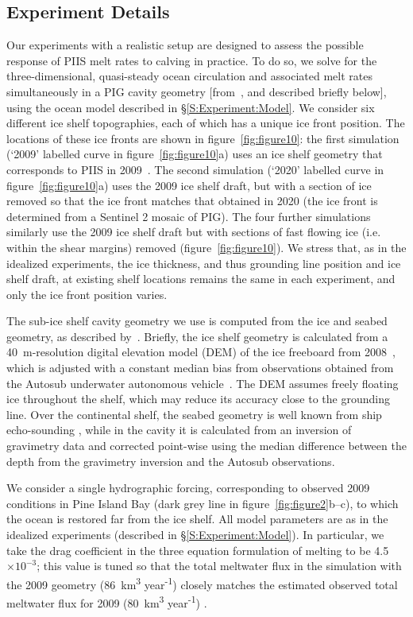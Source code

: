 \documentclass[draft]{agujournal2019}
\begin{document}
\subsection{Experiment Details}
Our experiments with a realistic setup are designed to assess the possible response of PIIS melt rates to calving in practice. To do so, we solve for the three-dimensional, quasi-steady ocean circulation and associated melt rates simultaneously in a PIG cavity geometry [from~, and described briefly below], using the ocean model described in \S\ref{S:Experiment:Model}. We consider six different ice shelf topographies, each of which has a unique ice front position. The locations of these ice fronts are shown in figure~\ref{fig:figure10}: the first simulation (`2009' labelled curve in figure~\ref{fig:figure10}a) uses an ice shelf geometry that corresponds to PIIS in 2009~\cite{Dutrieux2014Science}. The second simulation (`2020' labelled curve in figure~\ref{fig:figure10}a) uses the 2009 ice shelf draft, but with a section of ice removed so that the ice front matches that obtained in 2020 (the ice front is determined from a Sentinel 2 mosaic of PIG). The four further simulations similarly use the 2009 ice shelf draft but with sections of fast flowing ice (i.e. within the shear margins) removed (figure~\ref{fig:figure10}). We stress that, as in the idealized experiments, the ice thickness, and thus grounding line position and ice shelf draft, at existing shelf locations remains the same in each experiment, and only the ice front position varies.

The sub-ice shelf cavity geometry we use is computed from the ice and seabed geometry, as described by~. Briefly, the ice shelf geometry is calculated from a 40~m-resolution digital elevation model (DEM) of the ice freeboard from 2008~\cite{Korona2009Photogrammetry}, which is adjusted with a constant median bias from observations obtained from the Autosub underwater autonomous vehicle~\cite{Jenkins2010NatureGeo}. The DEM assumes freely floating ice throughout the shelf, which may reduce its accuracy close to the grounding line. Over the continental shelf, the seabed geometry is well known from ship echo-sounding \cite{Dutrieux2014Science}, while in the cavity it is calculated from an inversion of gravimetry data and corrected point-wise using the median difference between the depth from the gravimetry inversion and the Autosub observations.

We consider a single hydrographic forcing, corresponding to observed 2009 conditions in Pine Island Bay (dark grey line in figure~\ref{fig:figure2}b--c), to which the ocean is restored far from the ice shelf. All model parameters are as in the idealized experiments (described in \S\ref{S:Experiment:Model}). In particular, we take the drag coefficient in the three equation formulation of melting to be 4.5$\times10^{-3}$; this value is tuned so that the total meltwater flux in the simulation with the 2009 geometry (86~km\textsuperscript{3} year\textsuperscript{-1}) closely matches the estimated observed total meltwater flux for 2009 (80~km\textsuperscript{3} year\textsuperscript{-1}) \cite{Dutrieux2014Science}.
\end{document}
